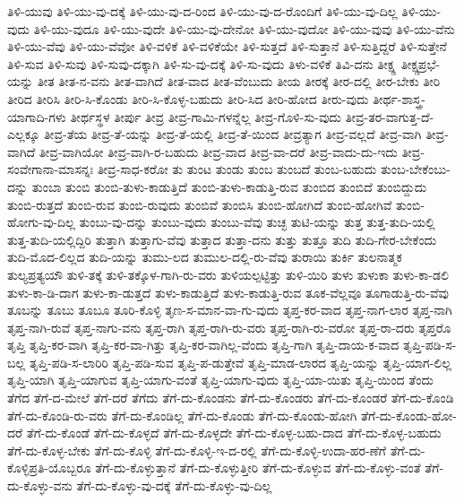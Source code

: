 {ತಿಳಿ-ಯುವು
ತಿಳಿ-ಯು-ವು-ದಕ್ಕೆ
ತಿಳಿ-ಯು-ವು-ದ-ರಿಂದ
ತಿಳಿ-ಯು-ವು-ದ-ರೊಂದಿಗೆ
ತಿಳಿ-ಯು-ವು-ದಿಲ್ಲ
ತಿಳಿ-ಯು-ವುದು
ತಿಳಿ-ಯು-ವುದೂ
ತಿಳಿ-ಯು-ವುದೇ
ತಿಳಿ-ಯು-ವು-ದೇನೋ
ತಿಳಿ-ಯು-ವುದೋ
ತಿಳಿ-ಯು-ವುವು
ತಿಳಿ-ಯು-ವೆನು
ತಿಳಿ-ಯು-ವೆವು
ತಿಳಿ-ಯು-ವೆವೋ
ತಿಳಿ-ವಳಿಕೆ
ತಿಳಿ-ವಳಿಕೆಯೇ
ತಿಳಿ-ಸುತ್ತದೆ
ತಿಳಿ-ಸುತ್ತಾನೆ
ತಿಳಿ-ಸುತ್ತಿದ್ದರೆ
ತಿಳಿ-ಸುತ್ತೇನೆ
ತಿಳಿ-ಸುವ
ತಿಳಿ-ಸುವು
ತಿಳಿ-ಸುವು-ದಕ್ಕಾಗಿ
ತಿಳಿ-ಸು-ವು-ದಕ್ಕೆ
ತಿಳಿ-ಸು-ವುದು
ತಿಳು-ವಳಿಕೆ
ತಿವಿ-ದನು
ತೀಕ್ಷ್ಣ
ತೀಕ್ಷ್ಣಪ್ರಭೆ-ಯನ್ನು
ತೀತ
ತೀತ-ನ-ವನು
ತೀತ-ವಾಗಿದೆ
ತೀತ-ವಾದ
ತೀತ-ವೆಂಬುದು
ತೀಯ
ತೀರಕ್ಕೆ
ತೀರ-ದಲ್ಲಿ
ತೀರ-ಬೇಕು
ತೀರಿ
ತೀರಿದ
ತೀರಿಸಿ
ತೀರಿ-ಸಿ-ಕೊಂಡು
ತೀರಿ-ಸಿ-ಕೊಳ್ಳ-ಬಹುದು
ತೀರಿ-ಸಿದ
ತೀರಿ-ಹೋದ
ತೀರು-ವುದು
ತೀರ್ಥ-ಶಾಸ್ತ್ರ-ಯಾಗಾದಿ-ಗಳು
ತೀರ್ಥಸ್ಥಳ
ತೀರ್ಪು
ತೀವ್ರ
ತೀವ್ರ-ಗಾಮಿ-ಗಳನ್ನೆಲ್ಲ
ತೀವ್ರ-ಗೊಳಿ-ಸು-ವುದು
ತೀವ್ರ-ತರ-ವಾಗುತ್ತ-ದೆ-ಎಲ್ಲಕ್ಕೂ
ತೀವ್ರ-ತೆಯ
ತೀವ್ರ-ತೆ-ಯನ್ನು
ತೀವ್ರ-ತೆ-ಯಲ್ಲಿ
ತೀವ್ರ-ತೆ-ಯಿಂದ
ತೀವ್ರತ್ಯಾಗ
ತೀವ್ರ-ವಲ್ಲದೆ
ತೀವ್ರ-ವಾಗಿ
ತೀವ್ರ-ವಾಗಿದೆ
ತೀವ್ರ-ವಾಗಿಯೋ
ತೀವ್ರ-ವಾಗಿ-ರ-ಬಹುದು
ತೀವ್ರ-ವಾದ
ತೀವ್ರ-ವಾ-ದರೆ
ತೀವ್ರ-ವಾದು-ದು-ಇದು
ತೀವ್ರ-ಸಂವೇಗಾನಾ-ಮಾಸನ್ನಃ
ತೀವ್ರ-ಸಾಧ-ಕರೋ
ತು
ತುಂಟ
ತುಂಡು
ತುಂಬ
ತುಂಬದೆ
ತುಂಬ-ಬಹುದು
ತುಂಬ-ಬೇಕೆಂಬು-ದನ್ನು
ತುಂಬಾ
ತುಂಬಿ
ತುಂಬಿ-ತುಳು-ಕಾಡುತ್ತಿದೆ
ತುಂಬಿ-ತುಳು-ಕಾಡುತ್ತಿ-ರುವ
ತುಂಬಿದ
ತುಂಬಿದೆ
ತುಂಬಿದ್ದುದು
ತುಂಬಿ-ರುತ್ತದೆ
ತುಂಬಿ-ರುವ
ತುಂಬಿ-ರುವುದು
ತುಂಬಿವೆ
ತುಂಬಿಸಿ
ತುಂಬಿ-ಹೋಗಿದೆ
ತುಂಬಿ-ಹೋಗಿವೆ
ತುಂಬಿ-ಹೋಗು-ವು-ದಿಲ್ಲ
ತುಂಬು-ವು-ದನ್ನು
ತುಂಬು-ವುದು
ತುಂಬು-ವೆವು
ತುಚ್ಛ
ತುಟಿ-ಯನ್ನು
ತುತ್ತ
ತುತ್ತ-ತುದಿ-ಯಲ್ಲಿ
ತುತ್ತ-ತುದಿ-ಯಲ್ಲಿದ್ದಿರಿ
ತುತ್ತಾಗಿ
ತುತ್ತಾಗು-ವೆವು
ತುತ್ತಾದ
ತುತ್ತಾ-ದನು
ತುತ್ತು
ತುತ್ತೂ
ತುದಿ
ತುದಿ-ಗೇರ-ಬೇಕೆಂದು
ತುದಿ-ಮೊದ-ಲಿಲ್ಲದ
ತುದಿ-ಯನ್ನು
ತುಮು-ಲದ
ತುಮುಲ-ದಲ್ಲಿ-ರು-ವೆವು
ತುರಾಯಿ
ತುರ್ಕಿ
ತುಲನಾತ್ಮಕ
ತುಲ್ಯಪ್ರತ್ಯಯೌ
ತುಳಿ-ತಕ್ಕೆ
ತುಳಿ-ತಕ್ಕೊಳ-ಗಾಗಿ-ರು-ವರು
ತುಳಿಯಲ್ಪಟ್ಟಿತ್ತು
ತುಳಿ-ಯಿರಿ
ತುಳು
ತುಳುಕಾ
ತುಳು-ಕಾ-ಡಲಿ
ತುಳು-ಕಾ-ಡಿ-ದಾಗ
ತುಳು-ಕಾ-ಡುತ್ತದೆ
ತುಳು-ಕಾಡುತ್ತಿದೆ
ತುಳು-ಕಾಡುತ್ತಿ-ರುವ
ತೂಕ-ವೆಲ್ಲವೂ
ತೂಗಾಡುತ್ತಿ-ರು-ವೆವು
ತೂಬನ್ನು
ತೂಬು
ತೂಬೂ
ತೂರಿ-ಕೊಳ್ಳಿ
ತೃಣ-ಸ-ಮಾನ-ವಾ-ಗು-ವುದು
ತೃಪ್ತ-ಕರ-ವಾದ
ತೃಪ್ತ-ನಾಗ-ಲಾರ
ತೃಪ್ತ-ನಾಗಿ
ತೃಪ್ತ-ನಾಗಿ-ರುವೆ
ತೃಪ್ತ-ನಾಗು-ವನು
ತೃಪ್ತ-ರಾಗಿ
ತೃಪ್ತ-ರಾಗಿ-ರು-ವರು
ತೃಪ್ತ-ರಾಗಿ-ರು-ವರೋ
ತೃಪ್ತ-ರಾ-ದರು
ತೃಪ್ತರೊ
ತೃಪ್ತಿ
ತೃಪ್ತಿ-ಕರ-ವಾಗಿ
ತೃಪ್ತಿ-ಕರ-ವಾ-ಗಿತ್ತು
ತೃಪ್ತಿ-ಕರ-ವಾಗಿಲ್ಲ-ವೆಂದು
ತೃಪ್ತಿ-ಗಾಗಿ
ತೃಪ್ತಿ-ದಾಯ-ಕ-ವಾದ
ತೃಪ್ತಿ-ಪಡಿ-ಸ-ಬಲ್ಲ
ತೃಪ್ತಿ-ಪಡಿ-ಸ-ಲಾರಿರಿ
ತೃಪ್ತಿ-ಪಡಿ-ಸುವ
ತೃಪ್ತಿ-ಪ-ಡುತ್ತೇವೆ
ತೃಪ್ತಿ-ಮಾಡ-ಲಾರದ
ತೃಪ್ತಿ-ಯನ್ನು
ತೃಪ್ತಿ-ಯಾಗ-ಲಿಲ್ಲ
ತೃಪ್ತಿ-ಯಾಗಿ
ತೃಪ್ತಿ-ಯಾಗುವ
ತೃಪ್ತಿ-ಯಾಗು-ವಂತೆ
ತೃಪ್ತಿ-ಯಾಗು-ವುದು
ತೃಪ್ತಿ-ಯಾ-ಯಿತು
ತೃಪ್ತಿ-ಯಿಂದ
ತೆಂದು
ತೆಗೆದ
ತೆಗೆ-ದ-ಮೇಲೆ
ತೆಗೆ-ದರೆ
ತೆಗೆದು
ತೆಗೆ-ದು-ಕೊಂಡನು
ತೆಗೆ-ದು-ಕೊಂಡರು
ತೆಗೆ-ದು-ಕೊಂಡರೆ
ತೆಗೆ-ದು-ಕೊಂಡಿ
ತೆಗೆ-ದು-ಕೊಂಡಿ-ರು-ವರು
ತೆಗೆ-ದು-ಕೊಂಡಿಲ್ಲ
ತೆಗೆ-ದು-ಕೊಂಡು
ತೆಗೆ-ದು-ಕೊಂಡು-ಹೋಗಿ
ತೆಗೆ-ದು-ಕೊಂಡು-ಹೋ-ದರೆ
ತೆಗೆ-ದು-ಕೊಂಡೆ
ತೆಗೆ-ದು-ಕೊಳ್ಳದೆ
ತೆಗೆ-ದು-ಕೊಳ್ಳದೇ
ತೆಗೆ-ದು-ಕೊಳ್ಳ-ಬಹು-ದಾದ
ತೆಗೆ-ದು-ಕೊಳ್ಳ-ಬಹುದು
ತೆಗೆ-ದು-ಕೊಳ್ಳ-ಬೇಕು
ತೆಗೆ-ದು-ಕೊಳ್ಳಿ
ತೆಗೆ-ದು-ಕೊಳ್ಳಿ-ಇ-ದ-ರಲ್ಲಿ
ತೆಗೆ-ದು-ಕೊಳ್ಳಿ-ಉದಾ-ಹರ-ಣೆಗೆ
ತೆಗೆ-ದು-ಕೊಳ್ಳಿಪ್ರತಿ-ಯೊಬ್ಬರೂ
ತೆಗೆ-ದು-ಕೊಳ್ಳುತ್ತಾನೆ
ತೆಗೆ-ದು-ಕೊಳ್ಳುತ್ತೀರಿ
ತೆಗೆ-ದು-ಕೊಳ್ಳುವ
ತೆಗೆ-ದು-ಕೊಳ್ಳು-ವಂತೆ
ತೆಗೆ-ದು-ಕೊಳ್ಳು-ವನು
ತೆಗೆ-ದು-ಕೊಳ್ಳು-ವು-ದಕ್ಕೆ
ತೆಗೆ-ದು-ಕೊಳ್ಳು-ವು-ದಿಲ್ಲ
}

